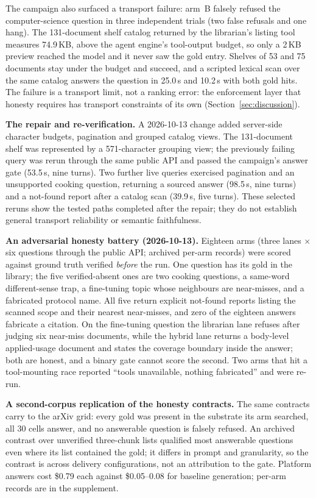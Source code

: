 The campaign also surfaced a transport failure: arm~B falsely refused the
computer-science question in three independent trials (two false refusals and
one hang). The 131-document shelf catalog returned by the librarian's listing
tool measures 74.9\,KB, above the agent engine's tool-output budget, so only a
2\,KB preview reached the model and it never saw the gold entry. Shelves of 53
and 75 documents stay under the budget and succeed, and a scripted lexical
scan over the same catalog answers the question in 25.0\,s and 10.2\,s with
both gold hits. The failure is a transport limit, not a ranking error: the
enforcement layer that honesty requires has transport constraints of its own
(Section~\ref{sec:discussion}).

\textbf{The repair and re-verification.} A 2026-10-13 change added
server-side character budgets, pagination and grouped catalog views. The
131-document shelf was represented by a 571-character grouping view; the
previously failing query was rerun through the same public API and passed the
campaign's answer gate (53.5\,s, nine turns). Two further live queries
exercised pagination and an unsupported cooking question, returning a sourced
answer (98.5\,s, nine turns) and a not-found report after a catalog scan
(39.9\,s, five turns).
These selected reruns show the tested paths completed after the repair; they do
not establish general transport reliability or semantic faithfulness.

\textbf{An adversarial honesty battery (2026-10-13).} Eighteen arms (three
lanes $\times$ six questions through the public API; archived per-arm records)
were scored against ground truth verified \emph{before} the run. One question
has its gold in the library; the five verified-absent ones are two cooking
questions, a same-word different-sense trap, a fine-tuning topic whose
neighbours are near-misses, and a fabricated protocol name. All five return
explicit not-found reports listing the scanned scope and their nearest
near-misses, and zero of the eighteen answers fabricate a citation. On the
fine-tuning question the librarian lane refuses after judging six near-miss
documents, while the hybrid lane returns a body-level applied-usage document
and states the coverage boundary inside the answer; both are honest, and a
binary gate cannot score the second. Two arms that hit a tool-mounting race
reported ``tools unavailable, nothing fabricated'' and were re-run.

\textbf{A second-corpus replication of the honesty contracts.} The same
contracts carry to the arXiv grid: every gold was present in the substrate its
arm searched, all 30 cells answer, and no answerable question is falsely
refused. An archived contrast over unverified three-chunk lists qualified most
answerable questions even where its list contained the gold; it differs in
prompt and granularity, so the contrast is across delivery configurations, not
an attribution to the gate. Platform answers cost \$0.79 each against
\$0.05--0.08 for baseline generation; per-arm records are in the supplement.


